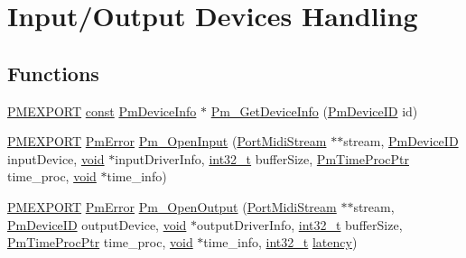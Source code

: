 \hypertarget{group__grp__device}{}\section{Input/\+Output Devices Handling}
\label{group__grp__device}
\subsection*{Functions}
\begin{DoxyCompactItemize}
\item 
\hyperlink{porttime_8h_ad478fb637833fb6b1a4bdb25a03f4662}{P\+M\+E\+X\+P\+O\+RT} \hyperlink{getopt1_8c_a2c212835823e3c54a8ab6d95c652660e}{const} \hyperlink{struct_pm_device_info}{Pm\+Device\+Info} $\ast$ \hyperlink{group__grp__device_ga2ff3676bcff6077e64ef6f3eb57fb37e}{Pm\+\_\+\+Get\+Device\+Info} (\hyperlink{portmidi_8h_a696cc4d4360bb8513f13df4bb134098a}{Pm\+Device\+ID} id)
\item 
\hyperlink{porttime_8h_ad478fb637833fb6b1a4bdb25a03f4662}{P\+M\+E\+X\+P\+O\+RT} \hyperlink{portmidi_8h_a5fd46ccd2e320e17a840886731e8c6b9}{Pm\+Error} \hyperlink{group__grp__device_gabd50a31baaa494ad8b405f9ad54c966e}{Pm\+\_\+\+Open\+Input} (\hyperlink{portmidi_8h_af4949219ee1bb0afc857cb242d123914}{Port\+Midi\+Stream} $\ast$$\ast$stream, \hyperlink{portmidi_8h_a696cc4d4360bb8513f13df4bb134098a}{Pm\+Device\+ID} input\+Device, \hyperlink{sound_8c_ae35f5844602719cf66324f4de2a658b3}{void} $\ast$input\+Driver\+Info, \hyperlink{lib-src_2ffmpeg_2win32_2stdint_8h_a37994e3b11c72957c6f454c6ec96d43d}{int32\+\_\+t} buffer\+Size, \hyperlink{portmidi_8h_a86cdcb85cfa72e067bc2fd1b96fca05d}{Pm\+Time\+Proc\+Ptr} time\+\_\+proc, \hyperlink{sound_8c_ae35f5844602719cf66324f4de2a658b3}{void} $\ast$time\+\_\+info)
\item 
\hyperlink{porttime_8h_ad478fb637833fb6b1a4bdb25a03f4662}{P\+M\+E\+X\+P\+O\+RT} \hyperlink{portmidi_8h_a5fd46ccd2e320e17a840886731e8c6b9}{Pm\+Error} \hyperlink{group__grp__device_ga134924cfa8badeecff3c5e1f22aee178}{Pm\+\_\+\+Open\+Output} (\hyperlink{portmidi_8h_af4949219ee1bb0afc857cb242d123914}{Port\+Midi\+Stream} $\ast$$\ast$stream, \hyperlink{portmidi_8h_a696cc4d4360bb8513f13df4bb134098a}{Pm\+Device\+ID} output\+Device, \hyperlink{sound_8c_ae35f5844602719cf66324f4de2a658b3}{void} $\ast$output\+Driver\+Info, \hyperlink{lib-src_2ffmpeg_2win32_2stdint_8h_a37994e3b11c72957c6f454c6ec96d43d}{int32\+\_\+t} buffer\+Size, \hyperlink{portmidi_8h_a86cdcb85cfa72e067bc2fd1b96fca05d}{Pm\+Time\+Proc\+Ptr} time\+\_\+proc, \hyperlink{sound_8c_ae35f5844602719cf66324f4de2a658b3}{void} $\ast$time\+\_\+info, \hyperlink{lib-src_2ffmpeg_2win32_2stdint_8h_a37994e3b11c72957c6f454c6ec96d43d}{int32\+\_\+t} \hyperlink{portmidi_2pm__test_2test_8c_abe13b7efd223bb5d20e2f3710b43bcd2}{latency})
\end{DoxyCompactItemize}


